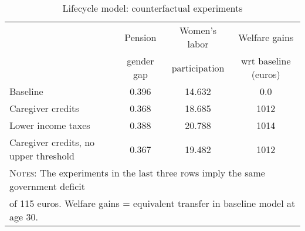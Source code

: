 \begin{table}[htbp]\caption{Lifecycle model: counterfactual experiments}\label{table:experiments}\centering\footnotesize\begin{tabular}{lccc} \toprule & Pension & Women's labor & Welfare gains  \\&gender gap &participation & wrt baseline (euros)  \\\midrule    Baseline                                &0.396&14.632& 0.0\\ Caregiver credits                       &0.368&18.685& 1012\\ Lower income taxes                      &0.388&20.788& 1014\\ Caregiver credits, no upper threshold   &0.367&19.482& 1012\\  \bottomrule\multicolumn{4}{l}{\textsc{Notes:} The experiments in the last three rows imply the same government deficit}\\\multicolumn{4}{l}{of   115 euros. Welfare gains = equivalent transfer in baseline model at age 30. }\end{tabular}
      \end{table}